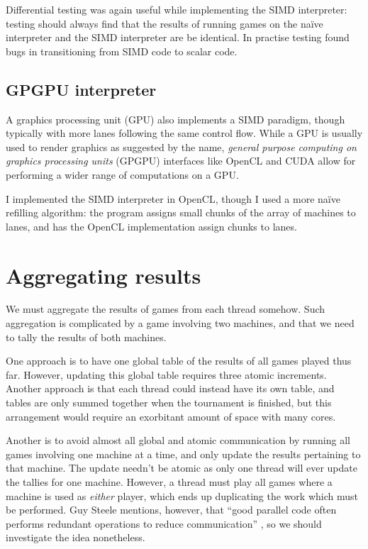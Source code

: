 Differential testing was again useful while implementing the SIMD
interpreter: testing should always find that the results of running games
on the na\"ive interpreter and the SIMD interpreter are be identical. In
practise testing found bugs in transitioning from SIMD code to scalar code.

\subsection{GPGPU interpreter}

A graphics processing unit (GPU) also implements a SIMD paradigm, though
typically with more lanes following the same control flow. While a GPU is
usually used to render graphics as suggested by the name, \emph{general
  purpose computing on graphics processing units} (GPGPU) interfaces like
OpenCL and CUDA allow for performing a wider range of computations on
a GPU.

I implemented the SIMD interpreter in OpenCL, though I used a more na\"ive
refilling algorithm: the program assigns small chunks of the array of
machines to lanes, and has the OpenCL implementation assign chunks to
lanes.

\section{Aggregating results}

We must aggregate the results of games from each thread somehow. Such
aggregation is complicated by a game involving two machines, and that
we need to tally the results of both machines.

One approach is to have one global table of the results of all games played
thus far. However, updating this global table requires three atomic
increments. Another approach is that each thread could instead have its
own table, and tables are only summed together when the tournament is
finished, but this arrangement would require an exorbitant amount of
space with many cores.

Another is to avoid almost all global and atomic communication by
running all games involving one machine at a time, and only update the
results pertaining to that machine. The update needn't be atomic as only
one thread will ever update the tallies for one machine. However, a thread
must play all games where a machine is used as \emph{either} player,
which ends up duplicating the work which must be performed. Guy Steele
mentions, however, that ``good parallel code often performs redundant
operations to reduce communication'' \cite{organizing-functional-code}, so
we should investigate the idea nonetheless.

